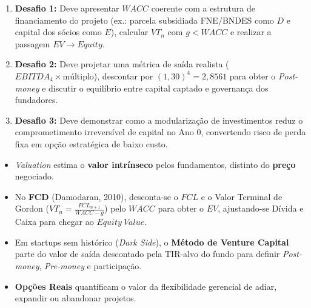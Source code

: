 \begin{boxGabarito}
\begin{enumerate}[leftmargin=1.5em, itemsep=3pt]
  \item \textbf{Desafio 1:} Deve apresentar $WACC$ coerente com a estrutura de financiamento do projeto (ex.: parcela subsidiada FNE/BNDES como $D$ e capital dos sócios como $E$), calcular $VT_n$ com $g < WACC$ e realizar a passagem $EV \to Equity$.
  \item \textbf{Desafio 2:} Deve projetar uma métrica de saída realista ($EBITDA_4 \times \text{múltiplo}$), descontar por $(1{,}30)^4 = 2{,}8561$ para obter o \textit{Post-money} e discutir o equilíbrio entre capital captado e governança dos fundadores.
  \item \textbf{Desafio 3:} Deve demonstrar como a modularização de investimentos reduz o comprometimento irreversível de capital no Ano $0$, convertendo risco de perda fixa em opção estratégica de baixo custo.
\end{enumerate}
\end{boxGabarito}

\begin{boxResumo}
\begin{itemize}[leftmargin=1.4em, itemsep=2pt]
  \item \textit{Valuation} estima o \textbf{valor intrínseco} pelos fundamentos, distinto do \textbf{preço} negociado.
  \item No \textbf{FCD} (Damodaran, 2010), desconta-se o $FCL$ e o Valor Terminal de Gordon ($VT_n = \frac{FCL_{n+1}}{WACC - g}$) pelo $WACC$ para obter o $EV$, ajustando-se Dívida e Caixa para chegar ao $Equity\ Value$.
  \item Em startups sem histórico (\textit{Dark Side}), o \textbf{Método de Venture Capital} parte do valor de saída descontado pela TIR-alvo do fundo para definir \textit{Post-money}, \textit{Pre-money} e participação.
  \item \textbf{Opções Reais} quantificam o valor da flexibilidade gerencial de adiar, expandir ou abandonar projetos.
\end{itemize}
\end{boxResumo}

